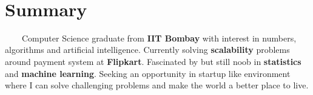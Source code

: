 \documentclass[12pt, a4paper]{deedy-resume}
\newcommand\textbox[1]{%
  \parbox{\textwidth}{#1}%
}
\begin{document}
\leavevmode \\
\lastupdated %
\section{Summary}
\textbox{
\-\ \-\ \-\ \-\ Computer Science graduate from \textbf{IIT Bombay} with interest in numbers, algorithms and artificial intelligence. Currently solving \textbf{scalability} problems around payment system at \textbf{Flipkart}. Fascinated by but still noob in \textbf{statistics} and \textbf{machine learning}. Seeking an opportunity in startup like environment where I can solve challenging problems and make the world a better place to live.\\}
\noindent\makebox[\linewidth]{\rule{\paperwidth}{0.4pt}}
\end{document}
